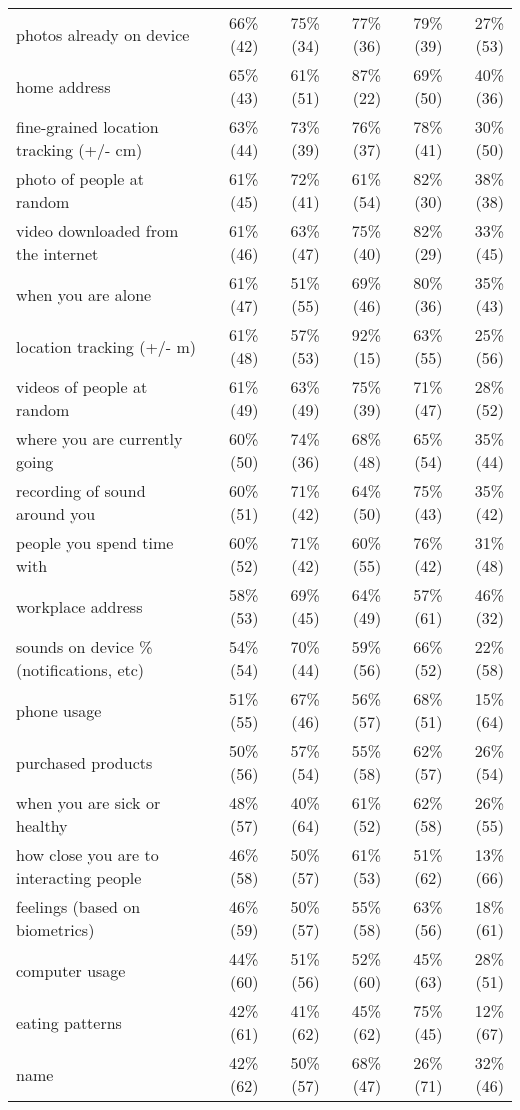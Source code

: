\begin{table*}[t]
\begin{center}
\begin{tabular}{| l | r | r | r | r | r |}
photos already on device & 66\% (42) & 75\% (34) & 77\% (36) & 79\% (39) & 27\% (53) \\ 
home address & 65\% (43) & 61\% (51) & 87\% (22) & 69\% (50) & 40\% (36) \\ 
fine-grained location tracking (+/-  cm) & 63\% (44) & 73\% (39) & 76\% (37) & 78\% (41) & 30\% (50) \\ 
photo of people at random & 61\% (45) & 72\% (41) & 61\% (54) & 82\% (30) & 38\% (38) \\ 
video downloaded from the internet & 61\% (46) & 63\% (47) & 75\% (40) & 82\% (29) & 33\% (45) \\ 
when you are alone & 61\% (47) & 51\% (55) & 69\% (46) & 80\% (36) & 35\% (43) \\ 
location tracking (+/- m) & 61\% (48) & 57\% (53) & 92\% (15) & 63\% (55) & 25\% (56) \\ 
videos of people at random & 61\% (49) & 63\% (49) & 75\% (39) & 71\% (47) & 28\% (52) \\ 
where you are currently going & 60\% (50) & 74\% (36) & 68\% (48) & 65\% (54) & 35\% (44) \\ 
recording of sound around you & 60\% (51) & 71\% (42) & 64\% (50) & 75\% (43) & 35\% (42) \\ 
people you spend time with & 60\% (52) & 71\% (42) & 60\% (55) & 76\% (42) & 31\% (48) \\ 
workplace address & 58\% (53) & 69\% (45) & 64\% (49) & 57\% (61) & 46\% (32) \\ 
sounds on device \% (notifications, etc) & 54\% (54) & 70\% (44) & 59\% (56) & 66\% (52) & 22\% (58) \\ 
phone usage & 51\% (55) & 67\% (46) & 56\% (57) & 68\% (51) & 15\% (64) \\ 
purchased products & 50\% (56) & 57\% (54) & 55\% (58) & 62\% (57) & 26\% (54) \\ 
when you are sick or healthy & 48\% (57) & 40\% (64) & 61\% (52) & 62\% (58) & 26\% (55) \\ 
how close you are to interacting people & 46\% (58) & 50\% (57) & 61\% (53) & 51\% (62) & 13\% (66) \\ 
feelings (based on biometrics) & 46\% (59) & 50\% (57) & 55\% (58) & 63\% (56) & 18\% (61) \\ 
computer usage& 44\% (60) & 51\% (56) & 52\% (60) & 45\% (63) & 28\% (51) \\ 
eating patterns & 42\% (61) & 41\% (62) & 45\% (62) & 75\% (45) & 12\% (67) \\ 
name & 42\% (62) & 50\% (57) & 68\% (47) & 26\% (71) & 32\% (46) \\ 

\end{tabular}
\end{center}
\end{table*}
